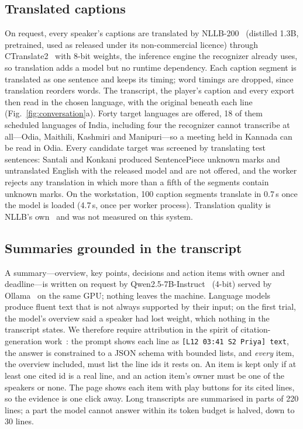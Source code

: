 \subsection{Translated captions}
On request, every speaker's captions are translated by NLLB-200~\cite{nllb2024} (distilled 1.3B, pretrained, used as released under its non-commercial licence) through CTranslate2~\cite{ctranslate2} with 8-bit weights, the inference engine the recognizer already uses, so translation adds a model but no runtime dependency. Each caption segment is translated as one sentence and keeps its timing; word timings are dropped, since translation reorders words. The transcript, the player's caption and every export then read in the chosen language, with the original beneath each line (Fig.~\ref{fig:conversation}a). Forty target languages are offered, 18 of them scheduled languages of India, including four the recognizer cannot transcribe at all---Odia, Maithili, Kashmiri and Manipuri---so a meeting held in Kannada can be read in Odia. Every candidate target was screened by translating test sentences: Santali and Konkani produced SentencePiece unknown marks and untranslated English with the released model and are not offered, and the worker rejects any translation in which more than a fifth of the segments contain unknown marks. On the workstation, 100 caption segments translate in 0.7\,s once the model is loaded (4.7\,s, once per worker process). Translation quality is NLLB's own~\cite{nllb2024} and was not measured on this system.

\subsection{Summaries grounded in the transcript}
A summary---overview, key points, decisions and action items with owner and deadline---is written on request by Qwen2.5-7B-Instruct~\cite{qwen2025} (4-bit) served by Ollama~\cite{ollama} on the same GPU; nothing leaves the machine. Language models produce fluent text that is not always supported by their input; on the first trial, the model's overview said a speaker had lost weight, which nothing in the transcript states. We therefore require attribution in the spirit of citation-generation work~\cite{gao2023alce}: the prompt shows each line as \texttt{[L12 03:41 S2 Priya] text}, the answer is constrained to a JSON schema with bounded lists, and \emph{every} item, the overview included, must list the line ids it rests on. An item is kept only if at least one cited id is a real line, and an action item's owner must be one of the speakers or none. The page shows each item with play buttons for its cited lines, so the evidence is one click away. Long transcripts are summarised in parts of 220 lines; a part the model cannot answer within its token budget is halved, down to 30 lines.

